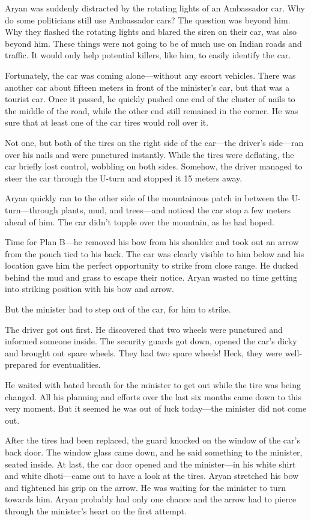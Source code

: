 Aryan was suddenly distracted by the rotating lights of an Ambassador car. Why
do some politicians still use Ambassador cars? The question was beyond him. Why
they flashed the rotating lights and blared the siren on their car, was also
beyond him. These things were not going to be of much use on Indian roads and
traffic. It would only help potential killers, like him, to easily identify the
car.

Fortunately, the car was coming alone—without any escort vehicles. There was
another car about fifteen meters in front of the minister's car, but that was a
tourist car. Once it passed, he quickly pushed one end of the cluster of nails
to the middle of the road, while the other end still remained in the corner. He
was sure that at least one of the car tires would roll over it.

Not one, but both of the tires on the right side of the car—the driver's side—ran
over his nails and were punctured instantly. While the tires were deflating, the
car briefly lost control, wobbling on both sides. Somehow, the driver managed to
steer the car through the U-turn and stopped it 15 meters away.

Aryan quickly ran to the other side of the mountainous patch in between the
U-turn—through plants, mud, and trees—and noticed the car stop a few meters
ahead of him. The car didn't topple over the mountain, as he had hoped.

Time for Plan B—he removed his bow from his shoulder and took out an arrow
from the pouch tied to his back. The car was clearly visible to him below and
his location gave him the perfect opportunity to strike from close range. He
ducked behind the mud and grass to escape their notice. Aryan wasted no time
getting into striking position with his bow and arrow.

But the minister had to step out of the car, for him to strike.

The driver got out first. He discovered that two wheels were punctured and
informed someone inside. The security guards got down, opened the car's dicky
and brought out spare wheels. They had two spare wheels! Heck, they were
well-prepared for eventualities.

He waited with bated breath for the minister to get out while the tire was being
changed. All his planning and efforts over the last six months came down to this
very moment. But it seemed he was out of luck today—the minister did not come
out.

After the tires had been replaced, the guard knocked on the window of the car's
back door. The window glass came down, and he said something to the minister,
seated inside. At last, the car door opened and the minister—in his white shirt
and white dhoti—came out to have a look at the tires. Aryan stretched his bow
and tightened his grip on the arrow. He was waiting for the minister to turn
towards him. Aryan probably had only one chance and the arrow had to pierce
through the minister's heart on the first attempt.

